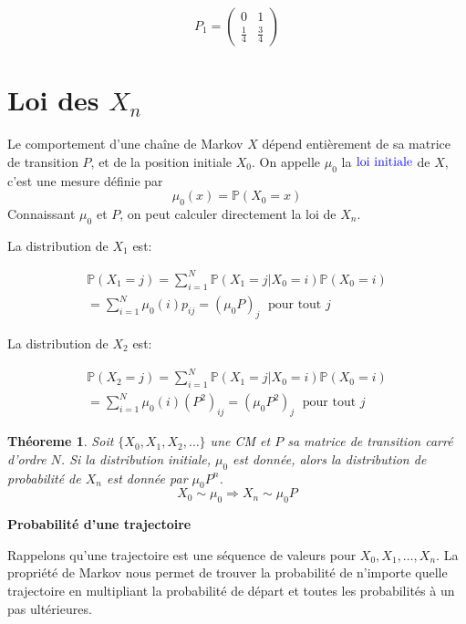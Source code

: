 \documentclass[
]{book}
\newtheorem{theorem}{Théoreme}[chapter]
\theoremstyle{definition}
\theoremstyle{definition}
\theoremstyle{definition}
\theoremstyle{remark}
\begin{document}
\[
P_1=\left( 
\begin{array}{cc}
0 & 1\\
\frac{1}{4} & \frac{3}{4}
\end{array}
\right)
\]

\hypertarget{loi-des-x_n}{%
\section{\texorpdfstring{Loi des \(X_n\)}{Loi des X\_n}}\label{loi-des-x_n}}

Le comportement d'une chaîne de Markov \(X\) dépend entièrement de sa matrice de transition \(P\), et de la position initiale \(X_0\). On appelle \(\mu_0\) la \(\color{blue}{\mathbf{\text{loi initiale}}}\) de \(X\), c'est une mesure définie par
\[
\mu_0(x)=\mathbb{P}(X_0=x)
\]
Connaissant \(\mu_0\) et \(P\), on peut calculer directement la loi de \(X_n\).

La distribution de \(X_1\) est:

\begin{align*} 
\mathbb{P}(X_1 = j) = \sum_{i=1}^N \mathbb{P}(X_1 = j | X_0 = i)\mathbb{P}(X_0 = i) \\
=
\sum_{i=1}^N \mu_0(i) p_{ij}=(\mu_0 P)_j\; \text{ pour tout }j
\end{align*}

La distribution de \(X_2\) est:

\begin{align*} 
\mathbb{P}(X_2 = j) = \sum_{i=1}^N \mathbb{P}(X_1 = j | X_0 = i)\mathbb{P}(X_0 = i) \\
=
\sum_{i=1}^N \mu_0(i) (P^2)_{ij}=(\mu_0 P^2)_j\; \text{ pour tout }j
\end{align*}

\begin{theorem}
\protect\hypertarget{thm:unnamed-chunk-49}{}{\label{thm:unnamed-chunk-49} }Soit \(\{X_0, X_1, X_2, \ldots \}\) une CM et \(P\) sa matrice de transition carré d'ordre \(N\). Si la distribution initiale, \(\mu_0\) est donnée, alors la distribution de probabilité de \(X_n\) est donnée par \(\mu_0 P^n\).
\[
X_0 \sim \mu_0 \Longrightarrow X_n \sim \mu_0 P
\]
\end{theorem}

\textbf{Probabilité d'une trajectoire}

Rappelons qu'une trajectoire est une séquence
de valeurs pour \(X_0, X_1,\ldots, X_n\). La propriété de Markov nous permet de trouver la probabilité de n'importe quelle trajectoire en multipliant la probabilité de départ et toutes les probabilités à un pas ultérieures.
\end{document}
